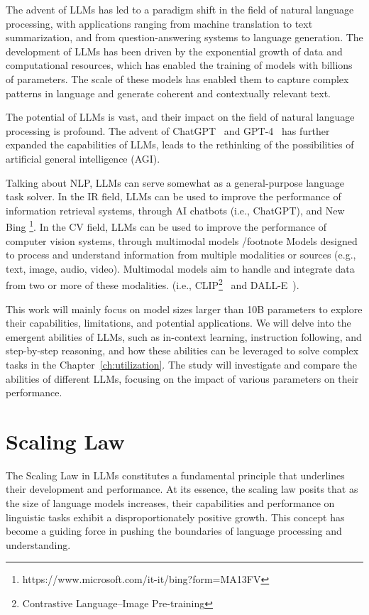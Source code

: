 The advent of LLMs has led to a paradigm shift in the field of natural language processing, with applications ranging from machine translation to text summarization, and from question-answering systems to language generation.
The development of LLMs has been driven by the exponential growth of data and computational resources, which has enabled the training of models with billions of parameters.
The scale of these models has enabled them to capture complex patterns in language and generate coherent and contextually relevant text.

The potential of LLMs is vast, and their impact on the field of natural language processing is profound.
The advent of ChatGPT~\cite{adiwardana2020towards} and GPT-4~\cite{openai2024gpt4} has further expanded the capabilities of LLMs, leads to the rethinking of the possibilities of artificial general intelligence (AGI).

Talking about NLP, LLMs can serve somewhat as a general-purpose language task solver.
In the IR field, LLMs can be used to improve the performance of information retrieval systems, through AI chatbots (i.e., ChatGPT), and New Bing \footnote{https://www.microsoft.com/it-it/bing?form=MA13FV}.
In the CV field, LLMs can be used to improve the performance of computer vision systems, through multimodal models /footnote{
Models designed to process and understand information from multiple modalities or sources (e.g., text, image, audio, video).
Multimodal models aim to handle and integrate data from two or more of these modalities.
} (i.e., CLIP\footnote{Contrastive Language–Image Pre-training}~\cite{radford2021learning} and DALL-E~\cite{ramesh2021zero}).

This work will mainly focus on model sizes larger than 10B parameters to explore their capabilities, limitations, and potential applications.
We will delve into the emergent abilities of LLMs, such as in-context learning, instruction following, and step-by-step reasoning, and how these abilities can be leveraged to solve complex tasks in the Chapter~\ref{ch:utilization}.
The study will investigate and compare the abilities of different LLMs, focusing on the impact of various parameters on their performance.


\section{Scaling Law}
\label{sec:scaling-law-in-large-language-models}

The Scaling Law in LLMs constitutes a fundamental principle that underlines their development and performance.
At its essence, the scaling law posits that as the size of language models increases, their capabilities and performance on linguistic tasks exhibit a disproportionately positive growth.
This concept has become a guiding force in pushing the boundaries of language processing and understanding.

